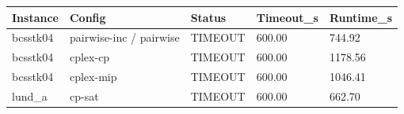 \begin{tabular}{lllll}
\hline
Instance & Config & Status & Timeout\_s & Runtime\_s \\
\hline
bcsstk04 & pairwise-inc / pairwise & TIMEOUT & 600.00 & 744.92 \\
bcsstk04 & cplex-cp & TIMEOUT & 600.00 & 1178.56 \\
bcsstk04 & cplex-mip & TIMEOUT & 600.00 & 1046.41 \\
lund\_a & cp-sat & TIMEOUT & 600.00 & 662.70 \\
\hline
\end{tabular}
